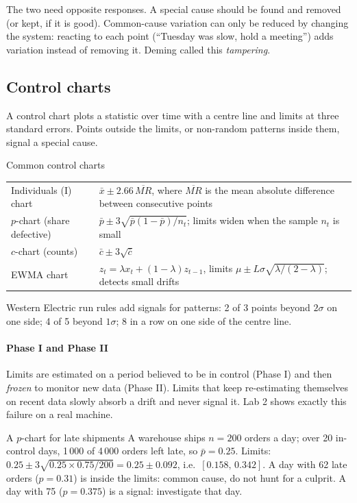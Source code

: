 The two need opposite responses. A special cause should be found and removed (or kept, if it is good). Common-cause
variation can only be reduced by changing the system: reacting to each point (``Tuesday was slow, hold a meeting'')
adds variation instead of removing it. Deming called this \emph{tampering}.

\subsection{Control charts}
A control chart plots a statistic over time with a centre line and limits at three standard errors. Points outside the
limits, or non-random patterns inside them, signal a special cause.

\begin{keyformula}{Common control charts}
\begin{tabular}{@{}L{3.3cm}L{9.6cm}@{}}
Individuals (I) chart & $\bar x \pm 2.66\,\overline{MR}$, where $\overline{MR}$ is the mean absolute difference between consecutive points\\
$p$-chart (share defective) & $\bar p \pm 3\sqrt{\bar p(1-\bar p)/n_t}$; limits widen when the sample $n_t$ is small\\
$c$-chart (counts) & $\bar c \pm 3\sqrt{\bar c}$\\
EWMA chart & $z_t=\lambda x_t+(1-\lambda)z_{t-1}$, limits $\mu\pm L\sigma\sqrt{\lambda/(2-\lambda)}$; detects small drifts\\
\end{tabular}
\smallskip
Western Electric run rules add signals for patterns: 2 of 3 points beyond $2\sigma$ on one side; 4 of 5 beyond $1\sigma$;
8 in a row on one side of the centre line.
\end{keyformula}

\paragraph{Phase I and Phase II} Limits are estimated on a period believed to be in control (Phase I) and then
\emph{frozen} to monitor new data (Phase II). Limits that keep re-estimating themselves on recent data slowly absorb a
drift and never signal it. Lab 2 shows exactly this failure on a real machine.

\begin{example}{A $p$-chart for late shipments}
A warehouse ships $n=200$ orders a day; over 20 in-control days, 1\,000 of 4\,000 orders left late, so $\bar p=0.25$.
Limits: $0.25\pm3\sqrt{0.25\times0.75/200}=0.25\pm0.092$, i.e.\ $[0.158,\,0.342]$. A day with 62 late orders
($p=0.31$) is inside the limits: common cause, do not hunt for a culprit. A day with 75 ($p=0.375$) is a signal:
investigate that day.
\end{example}


